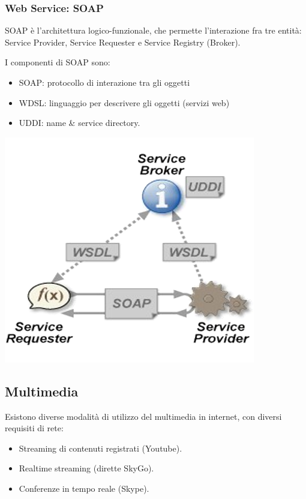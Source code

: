         \subsubsection{Web Service: SOAP}
            SOAP è l'architettura logico-funzionale, che permette l'interazione fra tre entità: Service Provider, Service Requester e Service Registry (Broker).

            I componenti di SOAP sono:
            \begin{itemize}
                \item SOAP: protocollo di interazione tra gli oggetti
                \item WDSL: linguaggio per descrivere gli oggetti (servizi web)
                \item UDDI: name \& service directory.
            \end{itemize}

            \begin{center}
                \includegraphics[scale=0.5]{chapters/6/assets/schema_z.png}
            \end{center}

    \subsection{Multimedia}
        Esistono diverse modalità di utilizzo del multimedia in internet, con diversi requisiti di rete:
        \begin{itemize}
            \item Streaming di contenuti registrati (Youtube). \item Realtime streaming (dirette SkyGo).
            \item Conferenze in tempo reale (Skype).
        \end{itemize}


